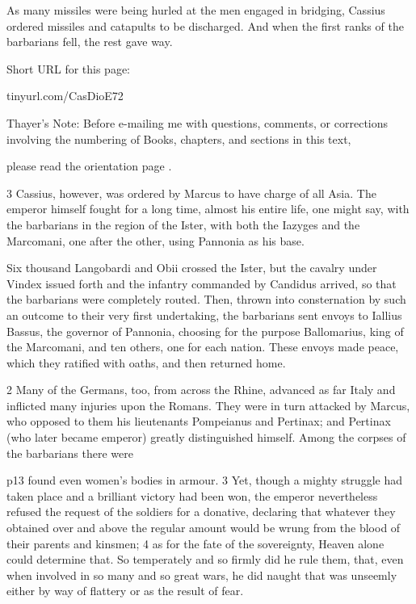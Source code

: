 As many missiles were being hurled at the men engaged in bridging, Cassius ordered missiles and catapults to be discharged. And when the first ranks of the barbarians fell, the rest gave way.


Short URL for this page:

tinyurl.com/CasDioE72

Thayer's Note: Before e-mailing me with questions, comments, or corrections involving the numbering of Books, chapters, and sections in this text,

please read the orientation page .


3
Cassius, however, was ordered by Marcus to have charge of all Asia. The emperor himself fought for a long time, almost his entire life, one might say, with the barbarians in the region of the Ister, with both the Iazyges and the Marcomani, one after the other, using Pannonia as his base.

Six thousand Langobardi and Obii crossed the Ister, but the cavalry under Vindex issued forth and the infantry commanded by Candidus arrived, so that the barbarians were completely routed. Then, thrown into consternation by such an outcome to their very first undertaking, the barbarians sent envoys to Iallius Bassus, the governor of Pannonia, choosing for the purpose Ballomarius, king of the Marcomani, and ten others, one for each nation. These envoys made peace, which they ratified with oaths, and then returned home.

2 Many of the Germans, too, from across the Rhine, advanced as far Italy and inflicted many injuries upon the Romans. They were in turn attacked by Marcus, who opposed to them his lieutenants Pompeianus and Pertinax; and Pertinax (who later became emperor) greatly distinguished himself. Among the corpses of the barbarians there were

p13 found even women's bodies in armour. 3 Yet, though a mighty struggle had taken place and a brilliant victory had been won, the emperor nevertheless refused the request of the soldiers for a donative, declaring that whatever they obtained over and above the regular amount would be wrung from the blood of their parents and kinsmen; 4 as for the fate of the sovereignty, Heaven alone could determine that.\texthebrew{⁠} So temperately and so firmly did he rule them, that, even when involved in so many and so great wars, he did naught that was unseemly either by way of flattery or as the result of fear.

